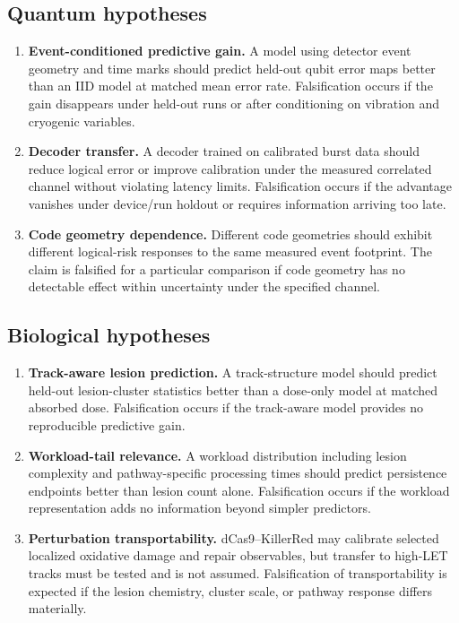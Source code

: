 \documentclass[11pt,a4paper,oneside]{article}
\begin{document}
\subsection{Quantum hypotheses}
\begin{enumerate}
\item \textbf{Event-conditioned predictive gain.} A model using detector event geometry and time marks should predict held-out qubit error maps better than an IID model at matched mean error rate. Falsification occurs if the gain disappears under held-out runs or after conditioning on vibration and cryogenic variables.
\item \textbf{Decoder transfer.} A decoder trained on calibrated burst data should reduce logical error or improve calibration under the measured correlated channel without violating latency limits. Falsification occurs if the advantage vanishes under device/run holdout or requires information arriving too late.
\item \textbf{Code geometry dependence.} Different code geometries should exhibit different logical-risk responses to the same measured event footprint. The claim is falsified for a particular comparison if code geometry has no detectable effect within uncertainty under the specified channel.
\end{enumerate}

\subsection{Biological hypotheses}
\begin{enumerate}
\item \textbf{Track-aware lesion prediction.} A track-structure model should predict held-out lesion-cluster statistics better than a dose-only model at matched absorbed dose. Falsification occurs if the track-aware model provides no reproducible predictive gain.
\item \textbf{Workload-tail relevance.} A workload distribution including lesion complexity and pathway-specific processing times should predict persistence endpoints better than lesion count alone. Falsification occurs if the workload representation adds no information beyond simpler predictors.
\item \textbf{Perturbation transportability.} dCas9--KillerRed may calibrate selected localized oxidative damage and repair observables, but transfer to high-LET tracks must be tested and is not assumed. Falsification of transportability is expected if the lesion chemistry, cluster scale, or pathway response differs materially.
\end{enumerate}
\end{document}
